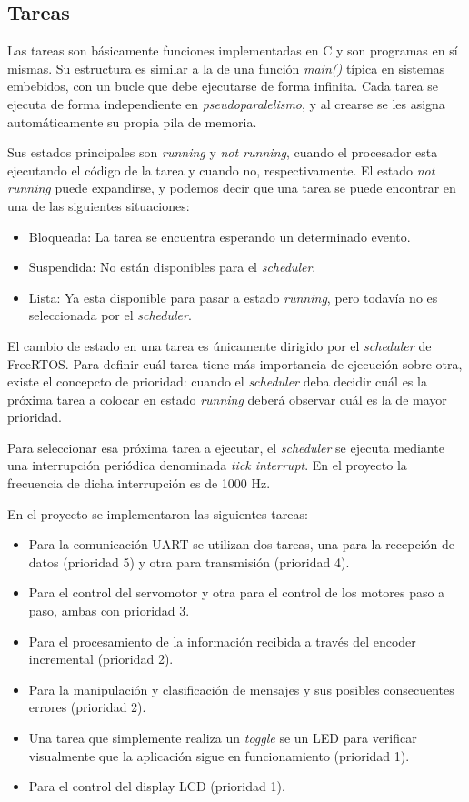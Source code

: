 \documentclass{IEEEtran}
\begin{document}
\subsection{Tareas}
Las tareas son básicamente funciones implementadas en C y son programas en sí mismas. Su estructura es similar a la de una función \textit{main()} típica en sistemas embebidos, con un bucle que debe ejecutarse de forma infinita. Cada tarea se ejecuta de forma independiente en \textit{pseudoparalelismo}, y al crearse se les asigna automáticamente su propia pila de memoria.

Sus estados principales son \textit{running} y \textit{not running}, cuando el procesador esta ejecutando el código de la tarea y cuando no, respectivamente. El estado \textit{not running} puede expandirse, y podemos decir que una tarea se puede encontrar en una de las siguientes situaciones:

\begin{itemize}
    \item Bloqueada: La tarea se encuentra esperando un determinado evento.
    \item Suspendida: No están disponibles para el \textit{scheduler}.
    \item Lista: Ya esta disponible para pasar a estado \textit{running}, pero todavía no es seleccionada por el \textit{scheduler}.
\end{itemize}

El cambio de estado en una tarea es únicamente dirigido por el \textit{scheduler} de FreeRTOS. Para definir cuál tarea tiene más importancia de ejecución sobre otra, existe el concepcto de prioridad: cuando el \textit{scheduler} deba decidir cuál es la próxima tarea a colocar en estado \textit{running} deberá observar cuál es la de mayor prioridad.

Para seleccionar esa próxima tarea a ejecutar, el \textit{scheduler} se ejecuta mediante una interrupción periódica denominada \textit{tick interrupt}. En el proyecto la frecuencia de dicha interrupción es de 1000 Hz.

En el proyecto se implementaron las siguientes tareas:

\begin{itemize}
    \item Para la comunicación UART se utilizan dos tareas, una para la recepción de datos (prioridad 5) y otra para transmisión (prioridad 4).
    \item Para el control del servomotor y otra para el control de los motores paso a paso, ambas con prioridad 3.
    \item Para el procesamiento de la información recibida a través del encoder incremental (prioridad 2).
    \item Para la manipulación y clasificación de mensajes y sus posibles consecuentes errores (prioridad 2).
    \item Una tarea que simplemente realiza un \textit{toggle} se un LED para verificar visualmente que la aplicación sigue en funcionamiento (prioridad 1).
    \item Para el control del display LCD (prioridad 1). 
\end{itemize}
\end{document}
